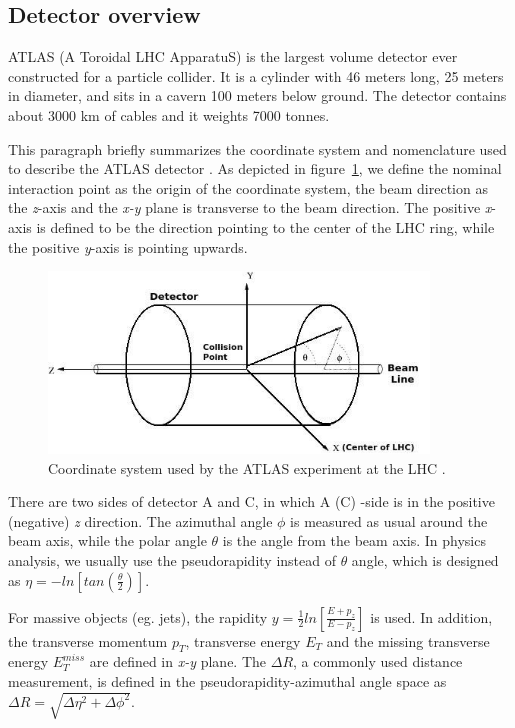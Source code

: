 \subsection{Detector overview}

ATLAS (A Toroidal LHC ApparatuS) is the largest volume detector ever constructed for a particle collider.
It is a cylinder with 46 meters long, 25 meters in diameter, and sits in a cavern 100 meters below ground.
The detector contains about 3000 km of cables and it weights 7000 tonnes.

This paragraph briefly summarizes the coordinate system and nomenclature used to describe the ATLAS detector \cite{Collaboration_2008}.
As depicted in figure~\ref{fig:coordinate}, we define the nominal interaction point as the origin of the coordinate system, the beam direction as the \textit{z}-axis and the \textit{x-y} plane is transverse to the beam direction.
The positive \textit{x}-axis is defined to be the direction pointing to the center of the LHC ring, 
while the positive \textit{y}-axis is pointing upwards.
\begin{figure}[!htb]
  \centering
  \includegraphics[width=0.9\textwidth]{figures/Detector/Coordinate_system_atlas.png}
  \caption{Coordinate system used by the ATLAS experiment at the LHC \cite{Perez:phdthesis}.}
  \label{fig:coordinate}
\end{figure}
There are two sides of detector A and C, in which A (C) -side is in the positive (negative) \textit{z} direction.
The azimuthal angle $\phi$ is measured as usual around the beam axis, while the polar angle $\theta$ is the angle from the beam axis.
In physics analysis, we usually use the pseudorapidity instead of $\theta$ angle, which is designed as $\eta = - ln \left[ tan\left( \frac{\theta}{2}\right) \right]$. 

For massive objects (eg. jets), the rapidity $y = \frac{1}{2} ln \left[ \frac{E+p_{z}}{E-p_{z}} \right]$ is used.
In addition, the transverse momentum $p_{T}$, transverse energy $E_{T}$ and the missing transverse energy $E_{T}^{miss}$ are defined in \textit{x-y} plane.
The $\Delta R$, a commonly used distance measurement, is defined in the pseudorapidity-azimuthal angle space as $\Delta R = \sqrt{ \Delta\eta^{2} + \Delta\phi^{2}}$.

